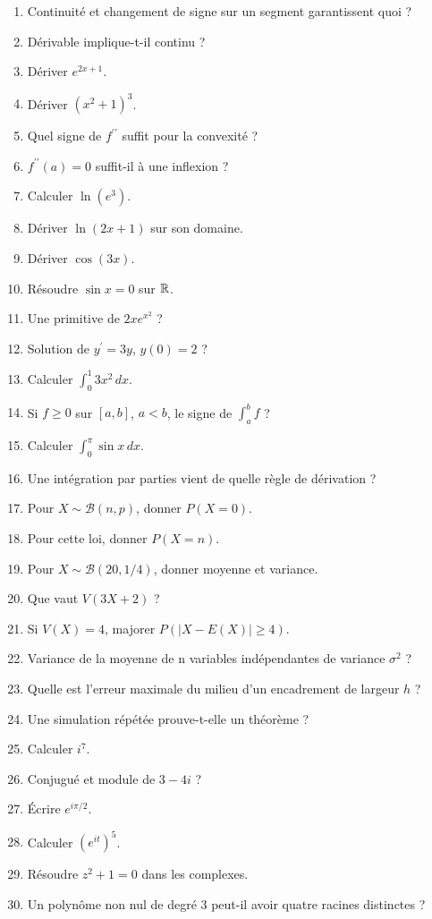 \begin{enumerate}
\item Continuité et changement de signe sur un segment garantissent quoi ?
\item Dérivable implique-t-il continu ?
\item Dériver $e^{2x+1}$.
\item Dériver $(x^2+1)^3$.
\item Quel signe de $f^{\prime\prime}$ suffit pour la convexité ?
\item $f^{\prime\prime}(a)=0$ suffit-il à une inflexion ?
\item Calculer $\ln(e^3)$.
\item Dériver $\ln(2x+1)$ sur son domaine.
\item Dériver $\cos(3x)$.
\item Résoudre $\sin x=0$ sur $\mathbb{R}$.
\item Une primitive de $2xe^{x^2}$ ?
\item Solution de $y^{\prime}=3y$, $y(0)=2$ ?
\item Calculer $\int_0^1 3x^2\,dx$.
\item Si $f\ge0$ sur $[a,b]$, $a<b$, le signe de $\int_a^bf$ ?
\item Calculer $\int_0^\pi\sin x\,dx$.
\item Une intégration par parties vient de quelle règle de dérivation ?
\item Pour $X\sim\mathcal B(n,p)$, donner $P(X=0)$.
\item Pour cette loi, donner $P(X=n)$.
\item Pour $X\sim\mathcal B(20,1/4)$, donner moyenne et variance.
\item Que vaut $V(3X+2)$ ?
\item Si $V(X)=4$, majorer $P(|X-E(X)|\ge4)$.
\item Variance de la moyenne de n variables indépendantes de variance $\sigma^2$ ?
\item Quelle est l’erreur maximale du milieu d’un encadrement de largeur $h$ ?
\item Une simulation répétée prouve-t-elle un théorème ?
\item Calculer $i^7$.
\item Conjugué et module de $3-4i$ ?
\item Écrire $e^{i\pi/2}$.
\item Calculer $(e^{it})^5$.
\item Résoudre $z^2+1=0$ dans les complexes.
\item Un polynôme non nul de degré 3 peut-il avoir quatre racines distinctes ?

\end{enumerate}
